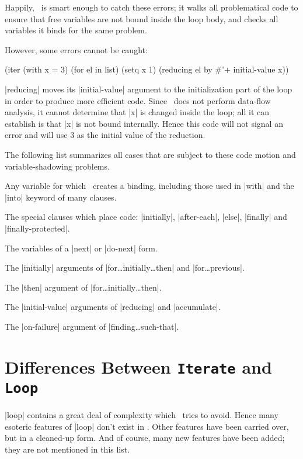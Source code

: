 Happily, \iter\ is smart enough to catch these errors; it
walks all problematical code to ensure that free variables are not
bound inside the loop body, and checks all variables it binds for the
same problem.

However, some errors cannot be caught:

\begin{program}
(iter (with x = 3)
      (for el in list)
      (setq x 1)
      (reducing el by \#'+ initial-value x))
\end{program}
|reducing| moves its |initial-value| argument to the initialization
part of the loop in order to produce more efficient code.  Since
\iter\ does not perform data-flow analysis, it cannot determine that
|x| is changed inside the loop; all it can establish is that |x| is
not bound internally.  Hence this code will not signal an
error and will use $3$ as the initial value of the reduction.

The following list summarizes all cases that are subject to these code
motion and variable-shadowing problems.
\begin{itemize}
\item Any variable for which \iter\ creates a binding, including those
used in |with| and the |into| keyword of many clauses.

\begin{sloppypar}
\item The special clauses which place code: |initially|, |after-each|, |else|,
|finally| and |finally-protected|.
\end{sloppypar}

\item The variables of a |next| or |do-next| form.

\item The |initially| arguments of |for\dots initially\dots then| and
|for\dots previous|.

\item The |then| argument of |for\dots initially\dots then|.

\item The |initial-value| arguments of |reducing| and |accumulate|.

\item The |on-failure| argument of |finding\dots such-that|.
\end{itemize}

\section{Differences Between {\tt Iterate} and {\tt Loop}}
|loop| contains a great deal of complexity which \iter\ tries to
avoid.  Hence many esoteric features of |loop| don't exist in \iter.
Other features have been carried over, but in a cleaned-up form.
And of course, many new features have been added; they are not
mentioned in this list.

